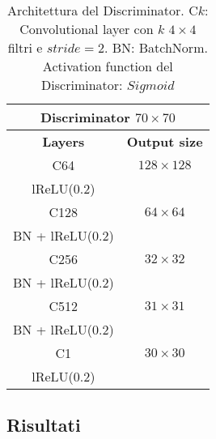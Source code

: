 \newpage
        \begin{table}[!h]
            \centering
            \begin{tabular}{|c|c|}
                \hline
                \multicolumn{2}{|c|}{\textbf{Discriminator $70 \times 70$}} \rule[-3mm]{0mm}{8mm}\\
                \hline \hline
                \rule[-3mm]{0mm}{8mm}
                \textbf{Layers} & \textbf{Output size} \\
                \hline \hline
                \rule[-3mm]{0mm}{8mm}
                C64                 & $128 \times 128$  \\
                lReLU(0.2) & \\
                \hline
                \rule[-3mm]{0mm}{8mm}
                C128                & $64 \times 64$  \\
                BN + lReLU(0.2) & \\
                \hline
                \rule[-3mm]{0mm}{8mm}
                C256                & $32 \times 32$  \\
                BN + lReLU(0.2) & \\
                \hline
                \rule[-3mm]{0mm}{8mm}
                C512                & $31 \times 31$  \\
                BN + lReLU(0.2) & \\
                \hline
                \rule[-3mm]{0mm}{8mm}
                C1                & $30 \times 30$  \\
                lReLU(0.2) & \\
                \hline
            \end{tabular}
            \caption{Architettura del Discriminator. 
            C$k$: Convolutional layer con $k$ $4 \times 4$ filtri e $stride=2$. BN: BatchNorm. \\
            Activation function del Discriminator: $Sigmoid$}
            \label{Discriminator architecture}
        \end{table}
    
    \subsection{Risultati}
    
